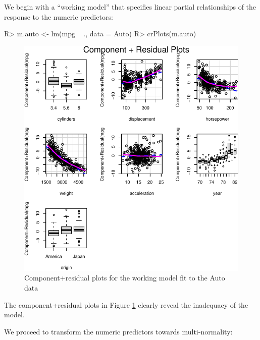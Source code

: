 \documentclass[
]{jss}
\begin{document}
We begin with a ``working model'' that specifies linear partial
relationships of the response to the numeric predictors:

\begin{CodeChunk}
\begin{CodeInput}
R> m.auto <- lm(mpg ~ ., data = Auto)
R> crPlots(m.auto)
\end{CodeInput}
\begin{figure}

{\centering \includegraphics[width=0.6\linewidth]{JSS-article-reduced_files/figure-latex/Auto-working-model-1} 

}

\caption[Component+residual plots for the working model fit to the Auto data]{Component+residual plots for the working model fit to the Auto data}\label{fig:Auto-working-model}
\end{figure}
\end{CodeChunk}

The component+residual plots in Figure \ref{fig:Auto-working-model}
clearly reveal the inadequacy of the model.

We proceed to transform the numeric predictors towards multi-normality:
\end{document}
